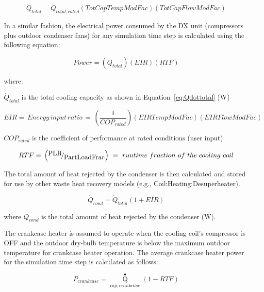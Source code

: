 \begin{equation}
{\dot{Q}_{total}} = {\dot{Q}_{total,rated}}\left( {TotCapTempModFac} \right)\left( {TotCapFlowModFac} \right)
\label{eq:Qdottotal}
\end{equation}

In a similar fashion, the electrical power consumed by the DX unit (compressors plus outdoor condenser fans) for any simulation time step is calculated using the following equation:

\begin{equation}
Power = \left( {{\dot{Q}_{total}}} \right)\left( {EIR} \right)\left( {RTF} \right)
\label{eq:CoilPower-456}
\end{equation}

where:

\(\dot{Q}_{total}\) is the total cooling capacity as shown in Equation~\ref{eq:Qdottotal} (W)

\begin{equation}
EIR = \,Energy\,input\,ratio\, = \,\left( {\frac{1}{{CO{P_{rated}}}}} \right)\left( {EIRTempModFac} \right)\left( {EIRFlowModFac} \right)
\end{equation}

\(CO{P_{rated}}\) is the coefficient of performance at rated conditions (user input)

\begin{equation}
RTF{\rm{ }} = {\rm{ }}\left( {{\raise0.7ex\hbox{{PLR}} \!\mathord{\left/ {\vphantom {{PLR} {PartLoadFrac}}}\right.}\!\lower0.7ex\hbox{{PartLoadFrac}}}} \right)\,\, = \,\,runtime~fraction~of~the~cooling~coil
\end{equation}

The total amount of heat rejected by the condenser is then calculated and stored for use by other waste heat recovery models (e.g., Coil:Heating:Desuperheater).

\begin{equation}
{\dot{Q}_{cond}} = {\dot{Q}_{total}}\left( {1 + EIR} \right)
\end{equation}

where \(\dot{Q}_{cond}\) is the total amount of heat rejected by the condenser (W).

The crankcase heater is assumed to operate when the cooling coil's compressor is OFF and the outdoor dry-bulb temperature is below the maximum outdoor temperature for crankcase heater operation. The average crankcase heater power for the simulation time step is calculated as follows:

\begin{equation}
{P_{crankcase}} = {\mathop Q\limits^ \bullet_{cap,crankcase}}\left( {1 - RTF} \right)
\end{equation}

